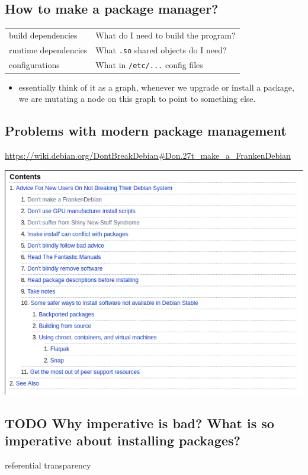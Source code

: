 \documentclass[11pt]{article}
\begin{document}
\subsection{How to make a package manager?}
\label{sec:org4f21010}
\begin{center}
\begin{tabular}{ll}
build dependencies & What do I need to build the program?\\
runtime dependencies & What \texttt{.so} shared objects do I need?\\
configurations & What in \texttt{/etc/...} config files\\
\end{tabular}
\end{center}
\begin{itemize}
\item essentially think of it as a graph, whenever we upgrade or install a package,
we are mutating a node on this graph to point to something else.
\end{itemize}
\subsection{Problems with modern package management}
\label{sec:orgf971c78}
\url{https://wiki.debian.org/DontBreakDebian\#Don.27t\_make\_a\_FrankenDebian}
\begin{center}
\includegraphics[width=.9\linewidth]{./images/screenshot-01.png}
\end{center}
\subsection{{\bfseries\sffamily TODO} Why imperative is bad? What is so imperative about installing packages?}
\label{sec:orgd53a3d8}
referential transparency
\end{document}
